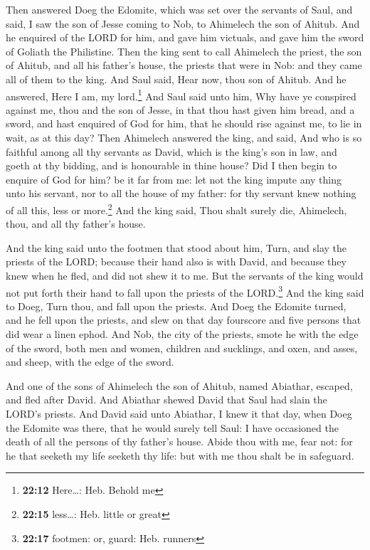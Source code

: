  Then answered Doeg the Edomite, which was set over the
servants of Saul, and said, I saw the son of Jesse coming to Nob, to
Ahimelech the son of Ahitub.  And he enquired of the LORD
for him, and gave him victuals, and gave him the sword of Goliath the
Philistine.  Then the king sent to call Ahimelech the
priest, the son of Ahitub, and all his father's house, the priests that
were in Nob: and they came all of them to the king.  And
Saul said, Hear now, thou son of Ahitub. And he answered, Here I am, my
lord.\footnote{\textbf{22:12} Here\ldots: Heb. Behold me}
 And Saul said unto him, Why have ye conspired against
me, thou and the son of Jesse, in that thou hast given him bread, and a
sword, and hast enquired of God for him, that he should rise against me,
to lie in wait, as at this day?  Then Ahimelech answered
the king, and said, And who is so faithful among all thy servants as
David, which is the king's son in law, and goeth at thy bidding, and is
honourable in thine house?  Did I then begin to enquire
of God for him? be it far from me: let not the king impute any thing
unto his servant, nor to all the house of my father: for thy servant
knew nothing of all this, less or more.\footnote{\textbf{22:15}
  less\ldots: Heb. little or great}  And the king said,
Thou shalt surely die, Ahimelech, thou, and all thy father's house.

 And the king said unto the footmen that stood about him,
Turn, and slay the priests of the LORD; because their hand also is with
David, and because they knew when he fled, and did not shew it to me.
But the servants of the king would not put forth their hand to fall upon
the priests of the LORD.\footnote{\textbf{22:17} footmen: or, guard:
  Heb. runners}  And the king said to Doeg, Turn thou,
and fall upon the priests. And Doeg the Edomite turned, and he fell upon
the priests, and slew on that day fourscore and five persons that did
wear a linen ephod.  And Nob, the city of the priests,
smote he with the edge of the sword, both men and women, children and
sucklings, and oxen, and asses, and sheep, with the edge of the sword.

 And one of the sons of Ahimelech the son of Ahitub,
named Abiathar, escaped, and fled after David.  And
Abiathar shewed David that Saul had slain the LORD's priests.
 And David said unto Abiathar, I knew it that day, when
Doeg the Edomite was there, that he would surely tell Saul: I have
occasioned the death of all the persons of thy father's house.
 Abide thou with me, fear not: for he that seeketh my
life seeketh thy life: but with me thou shalt be in safeguard.


